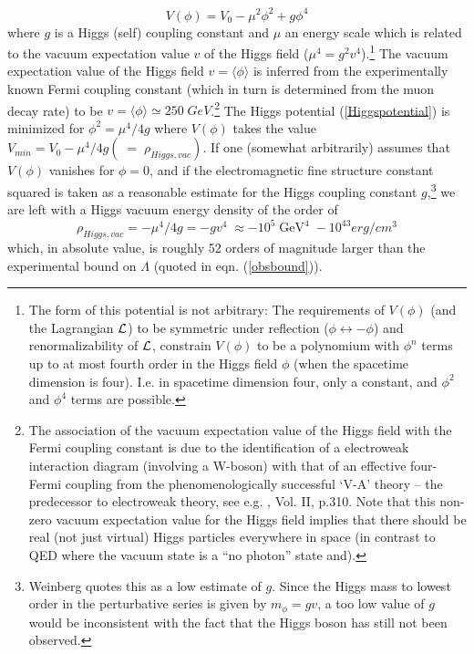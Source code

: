 \documentclass[12pt]{article}
\begin{document}
\begin{equation} \label{Higgspotential}
V(\phi) = V_0 - \mu ^2 \phi ^2 + g\phi ^4
\end{equation}
where $g$ is a Higgs (self) coupling constant and $\mu$ an energy
scale which is related to the vacuum expectation value $v$ of the
Higgs field ($\mu ^4 = g^2 v^4$).\footnote{The form of this potential
is not arbitrary: The requirements of $V(\phi)$ (and the Lagrangian
$\cal{L}$) to be symmetric under reflection ($\phi \leftrightarrow -
\phi$) and renormalizability of $\cal{L}$, constrain
$V(\phi)$ to be a polynomium with $\phi ^n$ terms up to at most fourth
order in the Higgs field $\phi$ (when the spacetime dimension is
four). I.e.  in spacetime dimension four, only a constant, and
$\phi^2$ and $\phi^4$ terms are possible.} The vacuum expectation
value of the Higgs field $v = \langle \phi \rangle$ is inferred from the
experimentally known Fermi coupling constant (which in turn is
determined from the muon decay rate) to be $v = \langle\phi\rangle  \simeq 250 \;
GeV$.\footnote{The association of the vacuum expectation value of
the Higgs field with the Fermi coupling constant is due to the
identification of a electroweak interaction diagram (involving a
W-boson) with that of an effective four-Fermi coupling from the
phenomenologically successful `V-A' theory -- the predecessor to
electroweak theory, see e.g. \cite{weinberg96}, Vol. II, p.310.
Note that this non-zero vacuum expectation value for the Higgs
field implies that there should be real (not just virtual) Higgs
particles everywhere in space (in contrast to QED where
the vacuum state is a ``no photon'' state and).} The Higgs potential
(\ref{Higgspotential}) is minimized for 
$\phi ^2 = \mu ^4 / 4g$ where $V(\phi)$  takes the value 
$ V_{min} = V_0 - \mu ^4/4g (\; = \; \rho _{Higgs,vac})$.
If one (somewhat arbitrarily) assumes that $V(\phi)$ vanishes 
for $\phi = 0$, and if the 
electromagnetic fine structure constant
squared is taken as a reasonable estimate for the Higgs coupling constant 
$g$,\footnote{Weinberg quotes
this as a low estimate of $g$. Since the Higgs mass to lowest order in
the perturbative series is given by $m_{\phi} = gv$, a too low value
of $g$ would be inconsistent with the fact that the Higgs boson has
still not been observed.} we
are left with a Higgs vacuum energy density of the order of
$$
\rho _{Higgs,vac}= -\mu ^4/ 4g = -gv^4 \; \approx -10^5 \; 
{\mbox{GeV}} ^4 \; -10^{43} erg/cm^3
$$
which, in absolute value, is roughly 52 orders of magnitude larger than
the experimental bound on $\Lambda$ (quoted in eqn.
(\ref{obsbound})).
\end{document}
